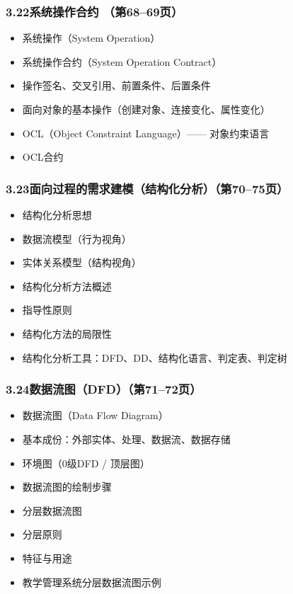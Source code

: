 \documentclass[12pt,a4paper]{ctexart}
\begin{document}
\subsubsection{3.22\quad 系统操作合约 \hfill（第68--69页）}
\begin{itemize}
    \item 系统操作（System Operation）
    \item 系统操作合约（System Operation Contract）
    \item 操作签名、交叉引用、前置条件、后置条件
    \item 面向对象的基本操作（创建对象、连接变化、属性变化）
    \item OCL（Object Constraint Language）—— 对象约束语言
    \item OCL合约
\end{itemize}

\subsubsection{3.23\quad 面向过程的需求建模（结构化分析）\hfill（第70--75页）}
\begin{itemize}
    \item 结构化分析思想
    \item 数据流模型（行为视角）
    \item 实体关系模型（结构视角）
    \item 结构化分析方法概述
    \item 指导性原则
    \item 结构化方法的局限性
    \item 结构化分析工具：DFD、DD、结构化语言、判定表、判定树
\end{itemize}

\subsubsection{3.24\quad 数据流图（DFD）\hfill（第71--72页）}
\begin{itemize}
    \item 数据流图（Data Flow Diagram）
    \item 基本成份：外部实体、处理、数据流、数据存储
    \item 环境图（0级DFD / 顶层图）
    \item 数据流图的绘制步骤
    \item 分层数据流图
    \item 分层原则
    \item 特征与用途
    \item 教学管理系统分层数据流图示例
\end{itemize}
\end{document}
